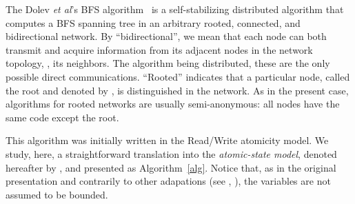 The Dolev \emph{et al}'s BFS algorithm~\cite{DIM93} is a
self-stabilizing distributed algorithm that computes a BFS spanning
tree in an arbitrary rooted, connected, and bidirectional network.  By
``bidirectional'', we mean that each node can both transmit and
acquire information from its adjacent nodes in the network topology,
\ie, its neighbors.  The algorithm being distributed, these are the
only possible direct communications.  ``Rooted'' indicates that a
particular node, called the root and denoted by \Root, is
distinguished in the network. As in the present case, algorithms for
rooted networks are usually semi-anonymous: all nodes have the same
code except the root.

This algorithm was initially written in the Read/Write atomicity
model. We study, here, a straightforward translation into the
\emph{atomic-state model}, denoted hereafter by \BFS, and presented as
Algorithm~\ref{alg}. Notice that, as in the original presentation
\cite{DIM93} and contrarily to other adapations (see \eg,
\cite{thebook}), the variables are not assumed to be bounded.

